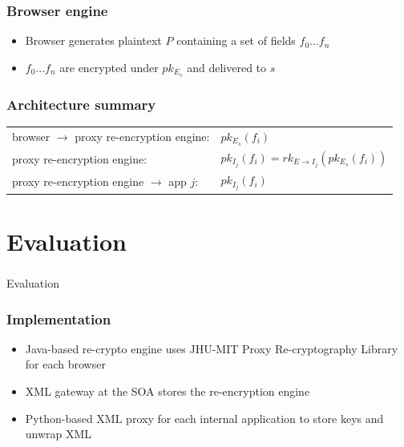 \documentclass{beamer}
\begin{document}
\begin{frame}
\frametitle{Browser engine}
\begin{itemize}
\item \alert{Browser} generates plaintext $P$ containing a set of fields
$f_0...f_n$
\item $f_0...f_n$ are encrypted under $pk_{E_s}$ and delivered to $s$
\end{itemize}
\end{frame}


\begin{frame}
\frametitle{Architecture summary}
\begin{tabular}{ll}
browser $\to$ proxy re-encryption engine: & $pk_{E_s}(f_i)$ \\
proxy re-encryption engine: & $pk_{I_j}(f_i) = rk_{E \to I_j}(pk_{E_s}(f_i))$ \\
proxy re-encryption engine $\to$ app $j$: & $pk_{I_j}(f_i)$ \\
\end{tabular}
\end{frame}

\section{Evaluation}
\begin{frame}
\frametitle{}
\begin{center}
Evaluation
\end{center}
\end{frame}

\begin{frame}
\frametitle{Implementation}
\begin{itemize}
\item Java-based re-crypto engine uses JHU-MIT Proxy Re-cryptography Library
for each browser 
\item XML gateway at the SOA stores the re-encryption engine 
\item Python-based XML proxy for each internal application to store keys and
unwrap XML
\end{itemize}
\end{frame}
\end{document}
